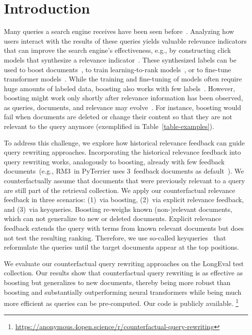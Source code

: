 \section{Introduction}


Many queries a search engine receives have been seen before~\cite{DBLP:journals/sigir/SilversteinHMM99}. Analyzing how users interact with the results of these queries yields valuable relevance indicators that can improve the search engine's effectiveness, e.g., by constructing click models that synthesize a relevance indicator~\cite{chuklin:2015}. These synthesized labels can be used to boost documents~\cite{keller:2024b}, to train learning-to-rank models~\cite{liu:2011}, or to fine-tune transformer models~\cite{lin:2021}. While the training and fine-tuning of models often require huge amounts of labeled data, boosting also works with few labels~\cite{keller:2024b}. However, boosting might work only shortly after relevance information has been observed, as queries, documents, and relevance may evolve~\cite{keller:2024}. For instance, boosting would fail when documents are deleted or change their content so that they are not relevant to the query anymore (exemplified in Table~\ref{table-examples}).




To address this challenge, we explore how historical relevance feedback can guide query rewriting approaches. Incorporating the historical relevance feedback into query rewriting works, analogously to boosting, already with few feedback documents~(e.g., RM3~in PyTerrier uses 3~feedback documents as default~\cite{macdonald:2020}). We counterfactually assume that documents that were previously relevant to a query are still part of the retrieval collection. We apply our counterfactual relevance feedback in three scenarios: (1)~via boosting, (2)~via explicit relevance feedback, and (3)~via keyqueries. Boosting re-weighs known (non-)relevant documents, which can not generalize to new or deleted documents. Explicit relevance feedback extends the query with terms from known relevant documents but does not test the resulting ranking. Therefore, we use so-called keyqueries~\cite{gollub:2013a} that reformulate the queries until the target documents appear at the top positions.

We evaluate our counterfactual query rewriting approaches on the LongEval test collection. Our results show that counterfactual query rewriting is as effective as boosting but generalizes to new documents, thereby being more robust than boosting and substantially outperforming neural transformers while being much more efficient as queries can be pre-computed. Our code is publicly available.%
\footnote{\url{https://anonymous.4open.science/r/counterfactual-query-rewriting}}


